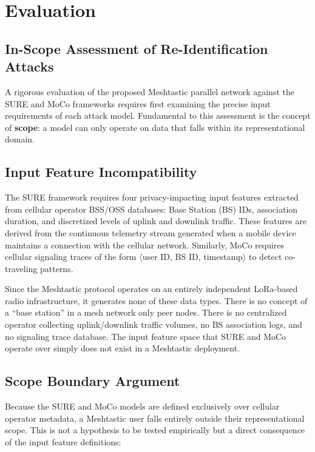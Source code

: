 \section{Evaluation}\label{sec:evaluation}

\subsection{In-Scope Assessment of Re-Identification Attacks}
A rigorous evaluation of the proposed Meshtastic parallel network against the SURE and MoCo frameworks requires first examining the precise input requirements of each attack model. Fundamental to this assessment is the concept of \textbf{scope}: a model can only operate on data that falls within its representational domain.

\subsection{Input Feature Incompatibility}
The SURE framework \cite{duan2025sure} requires four privacy-impacting input features extracted from cellular operator BSS/OSS databases: Base Station (BS) IDs, association duration, and discretized levels of uplink and downlink traffic. These features are derived from the continuous telemetry stream generated when a mobile device maintains a connection with the cellular network. Similarly, MoCo \cite{duan2025moco} requires cellular signaling traces of the form $\langle$user ID, BS ID, timestamp$\rangle$ to detect co-traveling patterns.

Since the Meshtastic protocol operates on an entirely independent LoRa-based radio infrastructure, it generates none of these data types. There is no concept of a ``base station'' in a mesh network only peer nodes. There is no centralized operator collecting uplink/downlink traffic volumes, no BS association logs, and no signaling trace database. The input feature space that SURE and MoCo operate over simply does not exist in a Meshtastic deployment.

\subsection{Scope Boundary Argument}
Because the SURE and MoCo models are defined exclusively over cellular operator metadata, a Meshtastic user falls entirely outside their representational scope. This is not a hypothesis to be tested empirically but a direct consequence of the input feature definitions:

